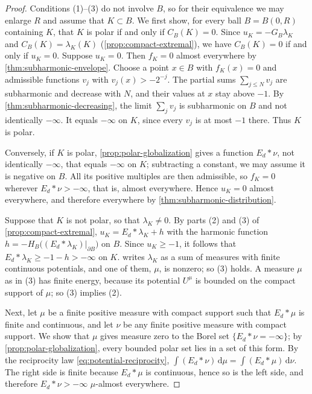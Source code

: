 \begin{proof}
Conditions (1)--(3) do not involve $B$, so for their equivalence we may enlarge $R$ and assume that $K\subset B$. We first show, for every ball $B=B(0,R)$ containing $K$, that $K$ is polar if and only if $C_B(K)=0$. Since $u_K=-G_B\lambda_K$ and $C_B(K)=\lambda_K(K)$ (\cref{prop:compact-extremal}), we have $C_B(K)=0$ if and only if $u_K=0$. Suppose $u_K=0$. Then $f_K=0$ almost everywhere by \cref{thm:subharmonic-envelope}. Choose a point $x\in B$ with $f_K(x)=0$ and admissible functions $v_j$ with $v_j(x)>-2^{-j}$. The partial sums $\sum_{j\leq N}v_j$ are subharmonic and decrease with $N$, and their values at $x$ stay above $-1$. By \cref{thm:subharmonic-decreasing}, the limit $\sum_jv_j$ is subharmonic on $B$ and not identically $-\infty$. It equals $-\infty$ on $K$, since every $v_j$ is at most $-1$ there. Thus $K$ is polar.

Conversely, if $K$ is polar, \cref{prop:polar-globalization} gives a function $E_d*\nu$, not identically $-\infty$, that equals $-\infty$ on $K$; subtracting a constant, we may assume it is negative on $B$. All its positive multiples are then admissible, so $f_K=0$ wherever $E_d*\nu>-\infty$, that is, almost everywhere. Hence $u_K=0$ almost everywhere, and therefore everywhere by \cref{thm:subharmonic-distribution}.

Suppose that $K$ is not polar, so that $\lambda_K\neq0$. By parts (2) and (3) of \cref{prop:compact-extremal}, $u_K=E_d*\lambda_K+h$ with the harmonic function $h=-H_B\bigl((E_d*\lambda_K)|_{\partial B}\bigr)$ on $B$. Since $u_K\geq-1$, it follows that $E_d*\lambda_K\geq-1-h>-\infty$ on $K$.  writes $\lambda_K$ as a sum of measures with finite continuous potentials, and one of them, $\mu$, is nonzero; so (3) holds. A measure $\mu$ as in (3) has finite energy, because its potential $U^\mu$ is bounded on the compact support of $\mu$; so (3) implies (2).

Next, let $\mu$ be a finite positive measure with compact support such that $E_d*\mu$ is finite and continuous, and let $\nu$ be any finite positive measure with compact support. We show that $\mu$ gives measure zero to the Borel set $\{E_d*\nu=-\infty\}$; by \cref{prop:polar-globalization}, every bounded polar set lies in a set of this form. By the reciprocity law \eqref{eq:potential-reciprocity}, $\int(E_d*\nu)\,\mathrm d\mu=\int(E_d*\mu)\,\mathrm d\nu$. The right side is finite because $E_d*\mu$ is continuous, hence so is the left side, and therefore $E_d*\nu>-\infty$ $\mu$-almost everywhere.


\end{proof}
